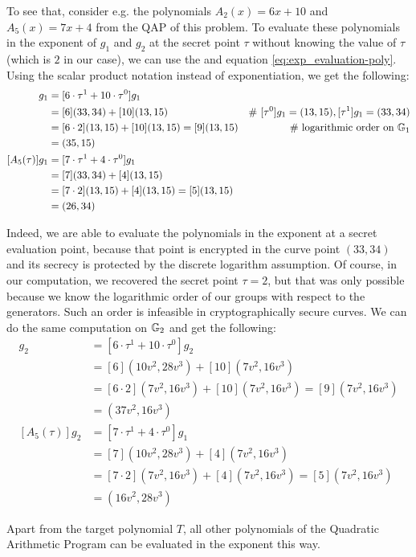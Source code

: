 \begin{example}
To see that, consider e.g. the polynomials $A_2(x)= 6x +10$ and $A_5(x)=7x+4$ from the QAP of this problem. To evaluate these polynomials in the exponent of $g_1$ and $g_2$ at the secret point $\tau$ without knowing the value of $\tau$ (which is $2$ in our case), we can use the  and equation \ref{eq:exp_evaluation-poly}. Using the scalar product notation instead of exponentiation, we get the following:
\begin{align*}
[A_2(\tau)]g_1 & = [6\cdot \tau^1 + 10\cdot \tau^0] g_1 \\
     & = [6](33,34) + [10](13,15) & \text{\# } [\tau^0]g_1 = (13,15), [\tau^1]g_1 = (33,34)\\
     & = [6\cdot 2](13,15) + [10](13,15) = [9](13,15) & \text{\# logarithmic order on } \G_1 \\   
     & = (35,15)\\
[A_5(\tau)]g_1 & = [7\cdot \tau^1 + 4\cdot \tau^0] g_1 \\
     & = [7](33,34) + [4](13,15) \\
     & = [7\cdot 2](13,15) + [4](13,15) = [5](13,15)\\
     & = (26,34)     
\end{align*}

Indeed, we are able to evaluate the polynomials in the exponent at a secret evaluation point, because that point is encrypted in the curve point $(33,34)$ and its secrecy is protected by the discrete logarithm assumption. Of course, in our computation, we recovered the secret point $\tau=2$, but that was only possible because we know the logarithmic order of our groups with respect to the generators. Such an order is infeasible in cryptographically secure curves. We can do the same computation on $\mathbb{G}_2$ and get the following:
\begin{align*}
[A_2(\tau)]g_2 & = [6\cdot \tau^1 + 10\cdot \tau^0] g_2 \\
     & = [6](10v^2,28v^3) + [10](7v^2,16v^3) \\
     & = [6\cdot 2](7v^2,16v^3) + [10](7v^2,16v^3) = [9](7v^2,16v^3) \\   
     & = (37v^2,16v^3)\\
[A_5(\tau)]g_2 & = [7\cdot \tau^1 + 4\cdot \tau^0] g_1 \\
     & = [7](10v^2,28v^3) + [4](7v^2,16v^3) \\
     & = [7\cdot 2](7v^2,16v^3) + [4](7v^2,16v^3) = [5](7v^2,16v^3)\\
     & = (16v^2,28v^3)     
\end{align*}

Apart from the target polynomial $T$, all other polynomials of the Quadratic Arithmetic Program can be evaluated in the exponent this way.
\end{example}

